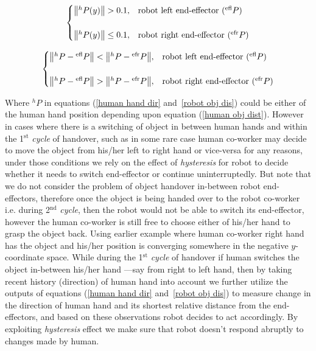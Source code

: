 \begin{equation}\label{human hand dir}
\centering
\begin{cases}
\norm{{}^{h}{P}(y)} > 0.1,  &  \text{robot left end-effector (${}^\text{efl}{P}$)} \\
\\
\norm{{}^{h}{P}(y)} \leq 0.1,  &  \text{robot right end-effector (${}^\text{efr}{P}$)}
\end{cases}         
\end{equation}

\begin{equation}\label{robot obj dis}
\centering
\begin{cases}
\norm{{}^{h}{P} - {}^\text{efl}{P}} < \norm{{}^{h}{P} - {}^\text{efr}{P}}, &  \text{robot left end-effector (${}^\text{efl}{P}$)} \\
\\
\norm{{}^{h}{P} - {}^\text{efl}{P}} > \norm{{}^{h}{P} - {}^\text{efr}{P}}, &  \text{robot right end-effector (${}^\text{efr}{P}$)}
\end{cases}
\end{equation}


Where ${}^{h}{P}$ in equations (\ref{human hand dir} and~\ref{robot obj dis}) could be either of the human hand position depending upon equation (\ref{human obj dist}). However in cases where there is a switching of object in between human hands and within the 1$^\text{st}$ \textit{cycle} of handover, such as in some rare case human co-worker may decide to move the object from his/her left to right hand or vice-versa for any reasons, under those conditions we rely on the effect of \textit{hysteresis} for robot to decide whether it needs to switch end-effector or continue uninterruptedly. But note that we do not consider the problem of object handover in-between robot end-effectors, therefore once the object is being handed over to the robot co-worker i.e. during 2$^\text{nd}$ \textit{cycle}, then the robot would not be able to switch its end-effector, however the human co-worker is still free to choose either of his/her hand to grasp the object back. Using earlier example where human co-worker right hand has the object and his/her position is converging somewhere in the negative $y$-coordinate space. While during the 1$^\text{st}$ \textit{cycle} of handover if human switches the object in-between his/her hand ---say from right to left hand, then by taking recent history (direction) of human hand into account we further utilize the outputs of equations (\ref{human hand dir} and~\ref{robot obj dis}) to measure change in the direction of human hand and its shortest relative distance from the end-effectors, and based on these observations robot decides to act accordingly. By exploiting \textit{hysteresis} effect we make sure that robot doesn't respond abruptly to changes made by human.


